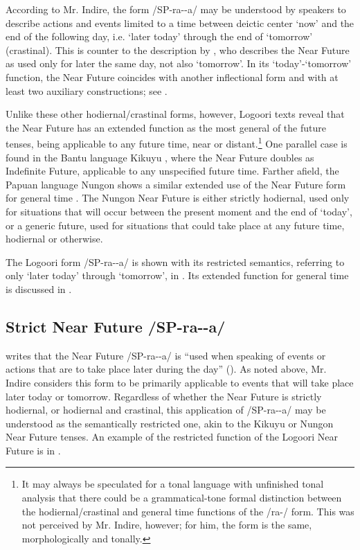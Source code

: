 \documentclass[output=paper]{langsci/langscibook}
\begin{document}
According to Mr. Indire, the form /SP-ra-{\longrule}-a/ may be understood by speakers to describe actions and events limited to a time between deictic center ‘now’ and the end of the following day, i.e. ‘later today’ through the end of ‘tomorrow’ (crastinal). This is counter to the description by \citet[174]{Leung1991}, who describes the Near Future as used only for later the same day, not also ‘tomorrow’. In its ‘today’-‘tomorrow’ function, the Near Future coincides with another inflectional form and with at least two auxiliary constructions; see .

Unlike these other hodiernal/crastinal forms, however, Logoori texts reveal that the Near Future has an extended function as the most general of the future tenses, being applicable to any future time, near or distant.\footnote{It may always be speculated for a tonal language with unfinished tonal analysis that there could be a grammatical-tone formal distinction between the hodiernal/crastinal and general time functions of the /ra-/ form. This was not perceived by Mr. Indire, however; for him, the form is the same, morphologically and tonally.} One parallel case is found in the Bantu language Kikuyu \citep[19]{Johnson1977}, where the Near Future doubles as Indefinite Future, applicable to any unspecified future time. Farther afield, the Papuan language Nungon shows a similar extended use of the Near Future form for general time \citep{Sarvasy2014}. The Nungon Near Future is either strictly hodiernal, used only for situations that will occur between the present moment and the end of ‘today’, or a generic future, used for situations that could take place at any future time, hodiernal or otherwise. 

The Logoori form /SP-ra-{\longrule}-a/ is shown with its restricted semantics, referring to only ‘later today’ through ‘tomorrow’, in . Its extended function for general time is discussed in .

\subsection{Strict Near Future /SP-ra-{\longrule}-a/}
\label{sec:sarvasy:3.1}

\citeauthor{Leung1991} writes that the Near Future /SP-ra-{\longrule}-a/ is “used when speaking of events or actions that are to take place later during the day” (\citeyear[174]{Leung1991}). As noted above, Mr. Indire considers this form to be primarily applicable to events that will take place later today or tomorrow. Regardless of whether the Near Future is strictly hodiernal, or hodiernal and crastinal, this application of /SP-ra-{\longrule}-a/ may be understood as the semantically restricted one, akin to the Kikuyu or Nungon Near Future tenses. An example of the restricted function of the Logoori Near Future is in . 
\end{document}
